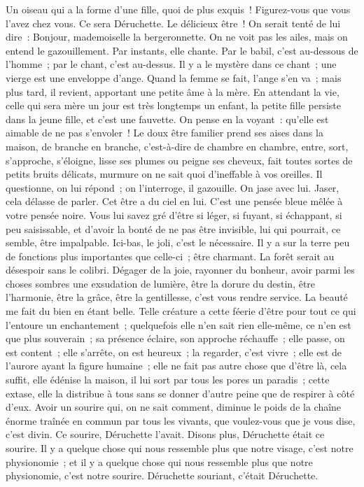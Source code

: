 \documentclass[french,twoside]{book} %
\begin{document}
Un oiseau qui a la forme d’une fille, quoi de plus exquis ! Figurez-vous que vous l’avez chez vous. Ce sera Déruchette. Le délicieux être ! On serait tenté de lui dire : Bonjour, mademoiselle la bergeronnette. On  ne voit pas les ailes, mais on entend le gazouillement. Par instants, elle chante. Par le babil, c’est au-dessous de l’homme ; par le chant, c’est au-dessus. Il y a le mystère dans ce chant ; une vierge est une enveloppe d’ange. Quand la femme se fait, l’ange s’en va ; mais plus tard, il revient, apportant une petite âme à la mère. En attendant la vie, celle qui sera mère un jour est très longtemps un enfant, la petite fille persiste dans la jeune fille, et c’est une fauvette. On pense en la voyant : qu’elle est aimable de ne pas s’envoler ! Le doux être familier prend ses aises dans la maison, de branche en branche, c’est-à-dire de chambre en chambre, entre, sort, s’approche, s’éloigne, lisse ses plumes ou peigne ses cheveux, fait toutes sortes de petits bruits délicats, murmure on ne sait quoi d’ineffable à vos oreilles. Il questionne, on lui répond ; on l’interroge, il gazouille. On jase avec lui. Jaser, cela délasse de parler. Cet être a du ciel en lui. C’est une pensée bleue mêlée à votre pensée noire. Vous lui savez gré d’être si léger, si fuyant, si échappant, si peu saisissable, et d’avoir la bonté de ne pas être invisible, lui qui pourrait, ce semble, être impalpable. Ici-bas, le joli, c’est le nécessaire. Il y a sur la terre peu de fonctions plus importantes que celle-ci ; être charmant. La forêt serait au désespoir sans le colibri. Dégager de la joie, rayonner du bonheur, avoir parmi les choses sombres une exsudation de lumière, être la dorure du destin, être l’harmonie, être la grâce, être la gentillesse, c’est vous rendre service. La beauté me fait du bien en étant belle. Telle créature a cette  féerie d’être pour tout ce qui l’entoure un enchantement ; quelquefois elle n’en sait rien elle-même, ce n’en est que plus souverain ; sa présence éclaire, son approche réchauffe ; elle passe, on est content ; elle s’arrête, on est heureux ; la regarder, c’est vivre ; elle est de l’aurore ayant la figure humaine ; elle ne fait pas autre chose que d’être là, cela suffit, elle édénise la maison, il lui sort par tous les pores un paradis ; cette extase, elle la distribue à tous sans se donner d’autre peine que de respirer à côté d’eux. Avoir un sourire qui, on ne sait comment, diminue le poids de la chaîne énorme traînée en commun par tous les vivants, que voulez-vous que je vous dise, c’est divin. Ce sourire, Déruchette l’avait. Disons plus, Déruchette était ce sourire. Il y a quelque chose qui nous ressemble plus que notre visage, c’est notre physionomie ; et il y a quelque chose qui nous ressemble plus que notre physionomie, c’est notre sourire. Déruchette souriant, c’était Déruchette.\par
\end{document}
